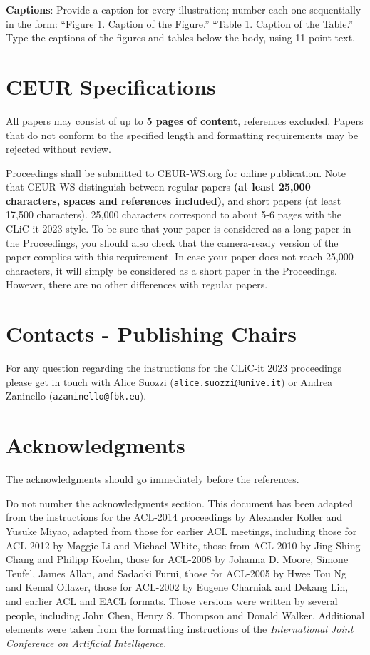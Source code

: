 \documentclass[11pt]{article}
\begin{document}
{\bf Captions}: Provide a caption for every illustration; number each one
sequentially in the form:  ``Figure 1. Caption of the Figure.'' ``Table 1.
Caption of the Table.''  Type the captions of the figures and 
tables below the body, using 11 point text.

\section{CEUR Specifications}
\label{sec:ceur-specs}

All papers may consist of up to {\bf 5 pages of content}, references excluded.  Papers that do not conform to the specified length and formatting requirements may be
rejected without review.

Proceedings shall be submitted to CEUR-WS.org for online publication. Note that CEUR-WS distinguish between regular papers \textbf{(at least 25,000 characters, spaces and references included)}, and short papers (at least 17,500 characters). 
25,000 characters correspond to about 5-6 pages with the CLiC-it 2023 style.
To be sure that your paper is considered as a long paper in the Proceedings, you should also check that the camera-ready version of the paper complies with this requirement. In case your paper does not reach 25,000 characters, it will simply be considered as a short paper in the Proceedings. However, there are no other differences with regular papers.

\section{Contacts - Publishing Chairs}
For any question regarding the instructions for the CLiC-it 2023 proceedings please get in touch with Alice Suozzi (\texttt{alice.suozzi@unive.it}) or Andrea Zaninello (\texttt{azaninello@fbk.eu}).


\section*{Acknowledgments}

The acknowledgments should go immediately before the references.

Do not number the acknowledgments section. This document has been adapted from the instructions for the ACL-2014 proceedings by Alexander Koller and Yusuke Miyao, adapted from those for earlier ACL meetings, including those for ACL-2012 by Maggie Li and Michael White, those from ACL-2010 by Jing-Shing Chang and Philipp Koehn, those for ACL-2008 by Johanna D. Moore, Simone Teufel, James Allan, and Sadaoki Furui, those for ACL-2005 by Hwee Tou Ng and Kemal Oflazer, those for ACL-2002 by Eugene Charniak and Dekang Lin, and earlier ACL and EACL formats. Those versions were written by several people, including John Chen, Henry S. Thompson and Donald Walker. Additional elements were taken from the formatting instructions of the {\em International Joint Conference on Artificial Intelligence}.



\end{document}
